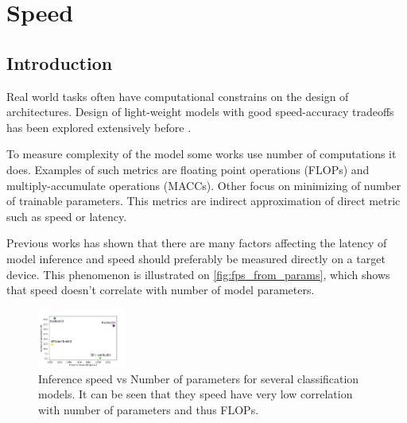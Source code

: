\chapter{Speed} \label{chap:speed}



\section{Introduction}



Real world tasks often have computational constrains on the design of architectures. Design of light-weight models with good speed-accuracy tradeoffs has been explored extensively before \cite{howard2017_mobilenetv1} \cite{sandler2018_mobilenetv2} \cite{ma2018_shufflenetv2} \cite{zhang2018_shufflenet}.  %

To measure complexity of the model some works use number of computations it does. Examples of such metrics are floating point operations (FLOPs) and multiply-accumulate operations (MACCs). Other focus on minimizing of number of trainable parameters. This metrics are indirect approximation of direct metric such as speed or latency. 

Previous works has shown \cite{radosavovic2020_designing} \cite{lee2020_compounding_improvements} that there are many factors affecting the latency of model inference and speed should preferably be measured directly on a target device. This phenomenon is illustrated on \autoref{fig:fps_from_params}, which shows that speed doesn't correlate with number of model parameters.   

\begin{figure} %
    \centering
    \includegraphics[width=0.26\textwidth]{images/fps_from_params.pdf}
    \caption{Inference speed vs Number of parameters for several classification models. It can be seen that they speed have very low correlation with number of parameters and thus FLOPs.}   \label{fig:fps_from_params}
\end{figure}

